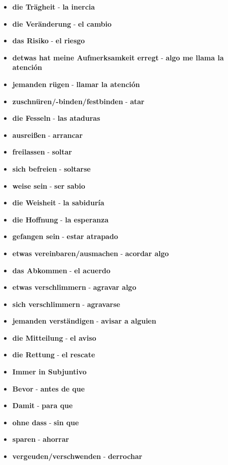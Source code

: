 \documentclass{article}
\begin{document}
\begin{multicols}{2}
\begin{itemize}
\begin{itemize}
			\item{\textbf{die Trägheit} - \textbf{la inercia}}
			\item{\textbf{die Veränderung} - \textbf{el cambio}}
			\item{\textbf{das Risiko} - \textbf{el riesgo}}
			\item{\textbf{detwas hat meine Aufmerksamkeit erregt} - \textbf{algo me llama la atención}}
			\item{\textbf{jemanden rügen} - \textbf{llamar la atención}}
			\item{\textbf{zuschnüren/-binden/festbinden} - \textbf{atar}}
			\item{\textbf{die Fesseln} - \textbf{las ataduras}}
			\item{\textbf{ausreißen} - \textbf{arrancar}}
			\item{\textbf{freilassen} - \textbf{soltar}}
			\item{\textbf{sich befreien} - \textbf{soltarse}}
			\item{\textbf{weise sein} - \textbf{ser sabio}}
			\item{\textbf{die Weisheit} - \textbf{la sabiduría}}
			\item{\textbf{die Hoffnung} - \textbf{la esperanza}}
			\item{\textbf{gefangen sein} - \textbf{estar atrapado}}
			\item{\textbf{etwas vereinbaren/ausmachen} - \textbf{acordar algo}}
			\item{\textbf{das Abkommen} - \textbf{el acuerdo}}
			\item{\textbf{etwas verschlimmern} - \textbf{agravar algo}}
			\item{\textbf{sich verschlimmern} - \textbf{agravarse}}
			\item{\textbf{jemanden verständigen} - \textbf{avisar a alguien}}
			\item{\textbf{die Mitteilung} - \textbf{el aviso}}
			\item{\textbf{die Rettung} - \textbf{el rescate}}
			\item{\textbf{Immer in Subjuntivo}}
			\item{\textbf{Bevor} - \textbf{antes de que}}
			\item{\textbf{Damit} - \textbf{para que}}
			\item{\textbf{ohne dass} - \textbf{sin que}}
			\item{\textbf{sparen} - \textbf{ahorrar}}
			\item{\textbf{vergeuden/verschwenden} - \textbf{derrochar}}

\end{itemize}
\end{itemize}
\end{multicols}
\end{document}
